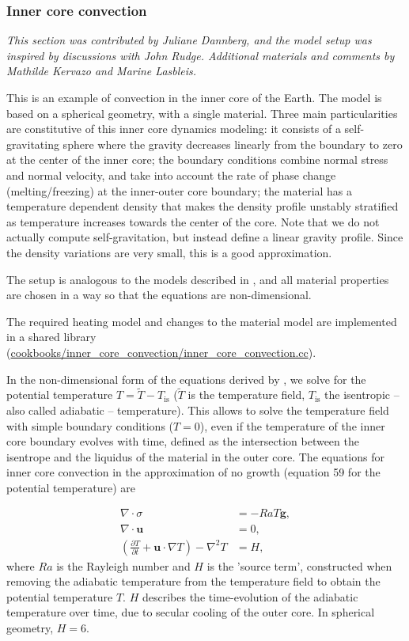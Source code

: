 \documentclass{article}
\begin{document}
\subsubsection{Inner core convection}
\label{sec:cookbooks-inner-core-convection}

\textit{This section was contributed by Juliane Dannberg, and the model setup was inspired 
by discussions with John Rudge. Additional materials and comments by Mathilde Kervazo and Marine Lasbleis.}

This is an example of convection in the inner core of the Earth. The model is based on a spherical geometry, with a single material. Three main particularities are constitutive of this inner core dynamics modeling: it consists of a self-gravitating sphere where the gravity decreases linearly from the boundary to zero at the center of the inner core; the boundary conditions combine normal stress and normal velocity, and take into account the rate of phase change (melting/freezing) at the inner-outer core boundary; the material has a temperature dependent density that makes the density profile unstably stratified as temperature increases towards the center of the core.
Note that we do not actually compute self-gravitation, but instead define a linear gravity profile. Since the density variations are very small, this is a good approximation.

The setup is analogous to the models described in \cite{Deguen2013}, and all material properties 
are chosen in a way so that the equations are non-dimensional.

The required heating model and changes to the material model are implemented in a shared library
(\url{cookbooks/inner_core_convection/inner_core_convection.cc}). 

In the non-dimensional form of the equations derived by \cite{Deguen2013}, we solve for the potential temperature $T = \tilde{T}-T_{\text{is}}$ ($\tilde{T}$ is the temperature field, $T_{\text{is}}$ the isentropic -- also called adiabatic -- temperature). This allows to solve the temperature field with simple boundary conditions ($T=0$), even if the temperature of the inner core boundary evolves with time, defined as the intersection between the isentrope and the liquidus of the material in the outer core.  
The equations for inner core convection in the approximation of no growth (equation 59 for the potential temperature) are

\begin{align}
  \label{eq:inner-core-1}
  \nabla \cdot \sigma &=
  -Ra T \mathbf g,
  \\
  \label{eq:inner-core-2}
  \nabla \cdot \mathbf u &= 0,
  \\
  \label{eq:inner-core-3}
  \left(\frac{\partial T}{\partial t} + \mathbf u\cdot\nabla T\right)
  - \nabla^2 T
  &=
  H,
\end{align}
where $Ra$ is the Rayleigh number and $H$ is the 'source term', constructed when removing the adiabatic temperature from the temperature field to obtain the potential temperature $T$. $H$ describes the time-evolution of the adiabatic temperature over time, due to secular cooling of the outer core. 
In spherical geometry, $H=6$. 
\end{document}
